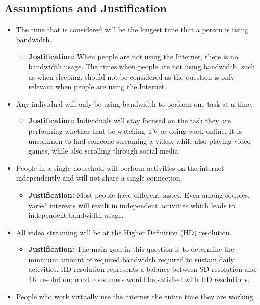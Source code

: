 \documentclass[12pt]{article}
\begin{document}
\subsection{Assumptions and Justification}
\begin{itemize}
    \item The time that is considered will be the longest time that a person is using bandwidth.
    \begin{itemize}
        \item \textbf{Justification:} When people are not using the Internet, there is no bandwidth usage. The times when people are not using bandwidth, such as when sleeping, should not be considered as the question is only relevant when people are using the Internet.
    \end{itemize}
    \item Any individual will only be using bandwidth to perform one task at a time.
    \begin{itemize}
        \item \textbf{Justification:} Individuals will stay focused on the task they are performing whether that be watching TV or doing work online. It is uncommon to find someone streaming a video, while also playing video games, while also scrolling through social media.
    \end{itemize}
    \item People in a single household will perform activities on the internet independently and will not share a single connection.
    \begin{itemize}
        \item \textbf{Justification:} Most people have different tastes. Even among couples, varied interests will result in independent activities which leads to independent bandwidth usage.
    \end{itemize}
    \item All video streaming will be at the Higher Definition (HD) resolution.
    \begin{itemize}
        \item \textbf{Justification:} The main goal in this question is to determine the minimum amount of required bandwidth required to sustain daily activities. HD resolution represents a balance between SD resolution and 4K resolution; most consumers would be satisfied with HD resolutions.
    \end{itemize}
    \item People who work virtually use the internet the entire time they are working.

\end{itemize}
\end{document}
